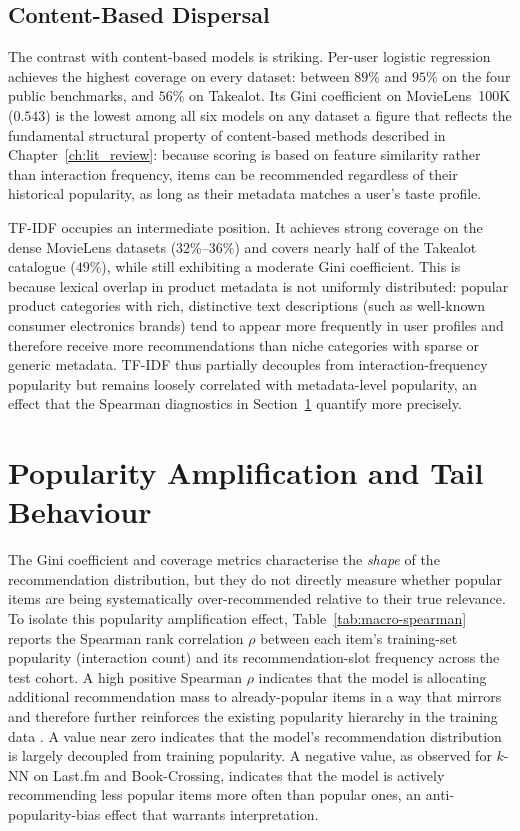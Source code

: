 \documentclass[11pt,a4paper]{report}
\begin{document}
\subsection*{Content-Based Dispersal}

The contrast with content-based models is striking. Per-user logistic regression achieves the highest coverage on every dataset: between $89\%$ and $95\%$ on the four public benchmarks, and $56\%$ on Takealot. Its Gini coefficient on MovieLens~100K ($0.543$) is the lowest among all six models on any dataset a figure that reflects the fundamental structural property of content-based methods described in Chapter~\ref{ch:lit_review}: because scoring is based on feature similarity rather than interaction frequency, items can be recommended regardless of their historical popularity, as long as their metadata matches a user's taste profile.

TF-IDF occupies an intermediate position. It achieves strong coverage on the dense MovieLens datasets ($32\%$--$36\%$) and covers nearly half of the Takealot catalogue ($49\%$), while still exhibiting a moderate Gini coefficient. This is because lexical overlap in product metadata is not uniformly distributed: popular product categories with rich, distinctive text descriptions (such as well-known consumer electronics brands) tend to appear more frequently in user profiles and therefore receive more recommendations than niche categories with sparse or generic metadata. TF-IDF thus partially decouples from interaction-frequency popularity but remains loosely correlated with metadata-level popularity, an effect that the Spearman diagnostics in Section~\ref{sec:expa_spearman} quantify more precisely.

\section{Popularity Amplification and Tail Behaviour}
\label{sec:expa_spearman}

The Gini coefficient and coverage metrics characterise the \emph{shape} of the recommendation distribution, but they do not directly measure whether popular items are being systematically over-recommended relative to their true relevance. To isolate this popularity amplification effect, Table~\ref{tab:macro-spearman} reports the Spearman rank correlation $\rho$ between each item's training-set popularity (interaction count) and its recommendation-slot frequency across the test cohort. A high positive Spearman $\rho$ indicates that the model is allocating additional recommendation mass to already-popular items in a way that mirrors and therefore further reinforces the existing popularity hierarchy in the training data \citep{abdollahpouri2019unfairness, steck2011itempopularity}. A value near zero indicates that the model's recommendation distribution is largely decoupled from training popularity. A negative value, as observed for $k$-NN on Last.fm and Book-Crossing, indicates that the model is actively recommending less popular items more often than popular ones, an anti-popularity-bias effect that warrants interpretation.
\end{document}
